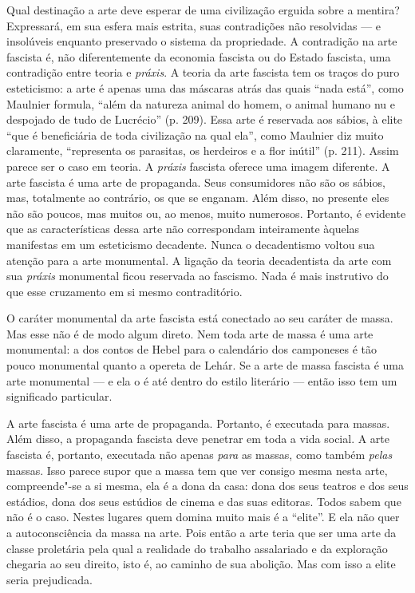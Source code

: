 Qual destinação a arte deve esperar de uma civilização erguida sobre a
mentira? Expressará, em sua esfera mais estrita, suas contradições não
resolvidas --- e insolúveis enquanto preservado o sistema da propriedade.
A contradição na arte fascista é, não diferentemente da economia
fascista ou do Estado fascista, uma contradição entre teoria e
\emph{práxis}. A teoria da arte fascista tem os traços do puro
esteticismo: a arte é apenas uma das máscaras atrás das quais ``nada
está'', como Maulnier formula, ``além da natureza animal do homem, o
animal humano nu e despojado de tudo de Lucrécio'' (p. 209). Essa arte é
reservada aos sábios, à elite ``que é beneficiária de toda civilização
na qual ela'', como Maulnier diz muito claramente, ``representa os
parasitas, os herdeiros e a flor inútil'' (p. 211). Assim parece ser o
caso em teoria. A \emph{práxis} fascista oferece uma imagem diferente.
A arte fascista é uma arte de propaganda. Seus consumidores não são os
sábios, mas, totalmente ao contrário, os que se enganam. Além disso, no
presente eles não são poucos, mas muitos ou, ao menos, muito numerosos.
Portanto, é evidente que as características dessa arte não correspondam
inteiramente àquelas manifestas em um esteticismo decadente. Nunca o
decadentismo voltou sua atenção para a arte monumental. A ligação da
teoria decadentista da arte com sua \emph{práxis} monumental ficou
reservada ao fascismo. Nada é mais instrutivo do que esse cruzamento
em si mesmo contraditório.

O caráter monumental da arte fascista está conectado ao seu caráter de
massa. Mas esse não é de modo algum direto. Nem toda arte de massa é uma
arte monumental: a dos contos de Hebel para o calendário dos camponeses
é tão pouco monumental quanto a opereta de Lehár. Se a arte de massa fascista
é uma arte monumental --- e ela o é até dentro do estilo literário ---
então isso tem um significado particular.

A arte fascista é uma arte de propaganda. Portanto, é executada para
massas. Além disso, a propaganda fascista deve penetrar em toda a vida
social. A arte fascista é, portanto, executada não apenas \emph{para} as
massas, como também \emph{pelas} massas. Isso parece supor que a massa
tem que ver consigo mesma nesta arte, compreende"-se a si mesma, ela é a
dona da casa: dona dos seus teatros e dos seus estádios, dona dos seus
estúdios de cinema e das suas editoras. Todos sabem que não é o caso.
Nestes lugares quem domina muito mais é a ``elite''. E ela não quer a
autoconsciência da massa na arte. Pois então a arte teria que ser uma
arte da classe proletária pela qual a realidade do trabalho assalariado
e da exploração chegaria ao seu direito, isto é, ao caminho de sua
abolição. Mas com isso a elite seria prejudicada.

